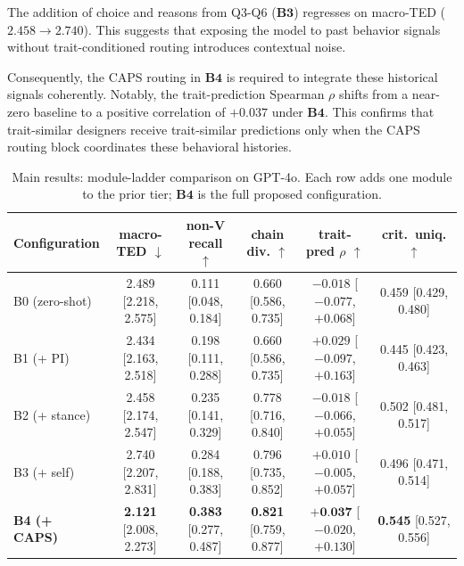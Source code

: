 \documentclass[11pt]{article}
\begin{document}
The addition of choice and reasons from Q3-Q6 ($\textbf{B3}$) regresses on macro-TED ($2.458 \rightarrow 2.740$). This suggests that exposing the model to past behavior signals without trait-conditioned routing introduces contextual noise. 

Consequently, the CAPS routing in $\textbf{B4}$ is required to integrate these historical signals coherently. Notably, the trait-prediction Spearman $\rho$ shifts from a near-zero baseline to a positive correlation of $+0.037$ under $\textbf{B4}$. This confirms that trait-similar designers receive trait-similar predictions only when the CAPS routing block coordinates these behavioral histories.

\begin{table}[t]
\centering
\small
\caption{Main results: module-ladder comparison on GPT-4o. Each row adds one module to the prior tier; $\textbf{B4}$ is the full proposed configuration.}
\label{tab:main_results_ladder}
\begin{tabular*}{\textwidth}{l @{\extracolsep{\fill}} ccccc}
\toprule
\textbf{Configuration} & \textbf{macro-TED} $\downarrow$ & \textbf{non-V recall} $\uparrow$ & \textbf{chain div.} $\uparrow$ & \textbf{trait-pred $\rho$} $\uparrow$ & \textbf{crit.\ uniq.} $\uparrow$ \\
\midrule
B0 (zero-shot)        & 2.489 \scriptsize{[2.218, 2.575]} & 0.111 \scriptsize{[0.048, 0.184]} & 0.660 \scriptsize{[0.586, 0.735]} & $-0.018$ \scriptsize{[$-0.077$, $+0.068$]} & 0.459 \scriptsize{[0.429, 0.480]} \\
B1 (+ PI)             & 2.434 \scriptsize{[2.163, 2.518]} & 0.198 \scriptsize{[0.111, 0.288]} & 0.660 \scriptsize{[0.586, 0.735]} & $+0.029$ \scriptsize{[$-0.097$, $+0.163$]} & 0.445 \scriptsize{[0.423, 0.463]} \\
B2 (+ stance)         & 2.458 \scriptsize{[2.174, 2.547]} & 0.235 \scriptsize{[0.141, 0.329]} & 0.778 \scriptsize{[0.716, 0.840]} & $-0.018$ \scriptsize{[$-0.066$, $+0.055$]} & 0.502 \scriptsize{[0.481, 0.517]} \\
B3 (+ self)           & 2.740 \scriptsize{[2.207, 2.831]} & 0.284 \scriptsize{[0.188, 0.383]} & 0.796 \scriptsize{[0.735, 0.852]} & $+0.010$ \scriptsize{[$-0.005$, $+0.057$]} & 0.496 \scriptsize{[0.471, 0.514]} \\
\textbf{B4 (+ CAPS)}  & \textbf{2.121} \scriptsize{[2.008, 2.273]} & \textbf{0.383} \scriptsize{[0.277, 0.487]} & \textbf{0.821} \scriptsize{[0.759, 0.877]} & $\textbf{+0.037}$ \scriptsize{[$-0.020$, $+0.130$]} & \textbf{0.545} \scriptsize{[0.527, 0.556]} \\
\bottomrule
\end{tabular*}
\end{table}
\end{document}
